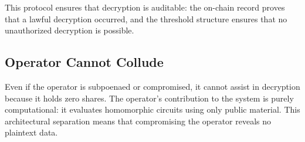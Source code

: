This protocol ensures that decryption is auditable: the on-chain record
proves that a lawful decryption occurred, and the threshold structure
ensures that no unauthorized decryption is possible.

\subsection{Operator Cannot Collude}

Even if the operator is subpoenaed or compromised, it cannot assist in
decryption because it holds zero shares.  The operator's contribution
to the system is purely computational: it evaluates homomorphic circuits
using only public material.  This architectural separation means that
compromising the operator reveals no plaintext data.

